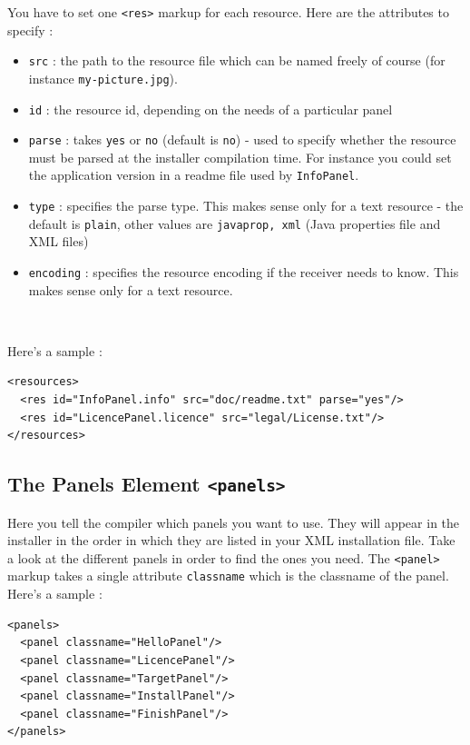 You have to set one \texttt{<res>} markup for each resource. Here are
the attributes to specify :
\begin{itemize}

  \item \texttt{src} : the path to the resource file which can be named freely
  of course (for instance \texttt{my-picture.jpg}).
  \item \texttt{id} : the resource id, depending on the needs of a particular panel
  \item \texttt{parse} : takes \texttt{yes} or \texttt{no} (default is
  \texttt{no}) - used to specify whether the resource must be parsed at the
  installer compilation time. For instance you could set the application version
  in a readme file used by \texttt{InfoPanel}.
  \item \texttt{type} : specifies the parse type. This makes sense only for a text
  resource  - the default is \texttt{plain}, other values are \texttt{javaprop,
  xml} (Java properties file and XML files)
  \item \texttt{encoding} : specifies the resource encoding if the receiver needs
  to know. This makes sense only for a text resource.

\end{itemize}\

Here's a sample :
\footnotesize
\begin{verbatim}
<resources>
  <res id="InfoPanel.info" src="doc/readme.txt" parse="yes"/>
  <res id="LicencePanel.licence" src="legal/License.txt"/>
</resources>
\end{verbatim}
\normalsize

\subsection{The Panels Element \texttt{<panels>}}
\label{panels-element}

Here you tell the compiler which panels you want to use. They will
appear in the installer in the order in which they are listed in your
XML installation file. Take a look at the different panels in order to
find the ones you need. The \texttt{<panel>} markup takes a single
attribute \texttt{classname} which is the classname of the panel.\\

Here's a sample :
\footnotesize
\begin{verbatim}
<panels>
  <panel classname="HelloPanel"/>
  <panel classname="LicencePanel"/>
  <panel classname="TargetPanel"/>
  <panel classname="InstallPanel"/>
  <panel classname="FinishPanel"/>
</panels>
\end{verbatim}
\normalsize

